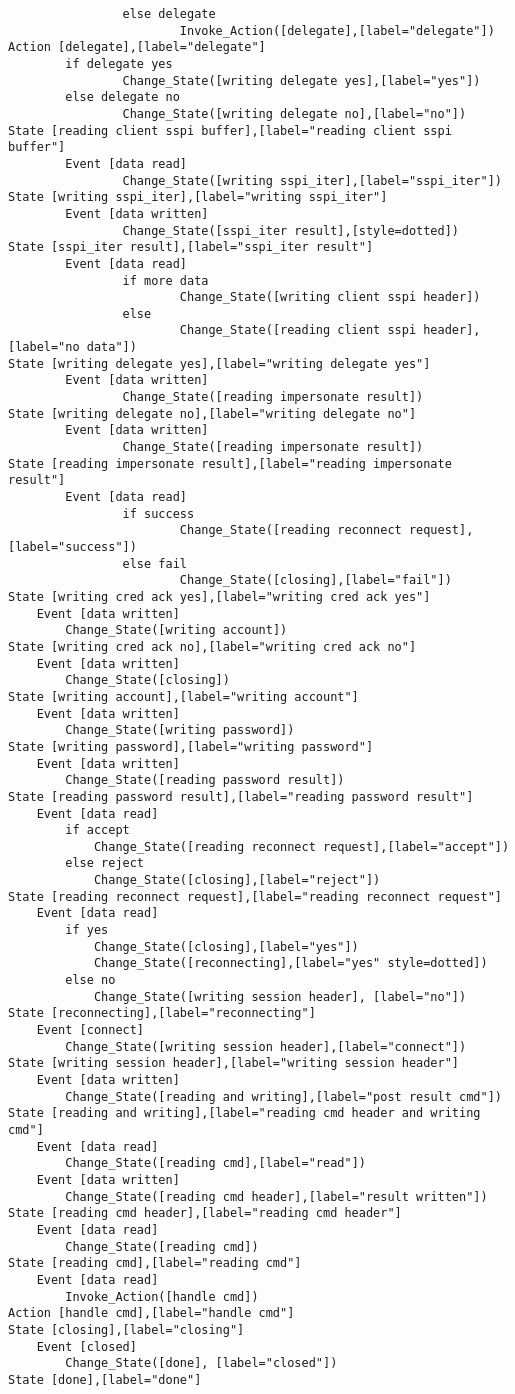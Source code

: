 \begin{verbatim}
                else delegate
                        Invoke_Action([delegate],[label="delegate"])
Action [delegate],[label="delegate"]
        if delegate yes
                Change_State([writing delegate yes],[label="yes"])
        else delegate no
                Change_State([writing delegate no],[label="no"])
State [reading client sspi buffer],[label="reading client sspi buffer"]
        Event [data read]
                Change_State([writing sspi_iter],[label="sspi_iter"])
State [writing sspi_iter],[label="writing sspi_iter"]
        Event [data written]
                Change_State([sspi_iter result],[style=dotted])
State [sspi_iter result],[label="sspi_iter result"]
        Event [data read]
				if more data
						Change_State([writing client sspi header])
				else
						Change_State([reading client sspi header],[label="no data"])
State [writing delegate yes],[label="writing delegate yes"]
        Event [data written]
                Change_State([reading impersonate result])
State [writing delegate no],[label="writing delegate no"]
        Event [data written]
                Change_State([reading impersonate result])
State [reading impersonate result],[label="reading impersonate result"]
        Event [data read]
                if success
                        Change_State([reading reconnect request],[label="success"])
                else fail
                        Change_State([closing],[label="fail"])
State [writing cred ack yes],[label="writing cred ack yes"]
	Event [data written]
		Change_State([writing account])
State [writing cred ack no],[label="writing cred ack no"]
	Event [data written]
		Change_State([closing])
State [writing account],[label="writing account"]
	Event [data written]
		Change_State([writing password])
State [writing password],[label="writing password"]
	Event [data written]
		Change_State([reading password result])
State [reading password result],[label="reading password result"]
	Event [data read]
		if accept
			Change_State([reading reconnect request],[label="accept"])
		else reject
			Change_State([closing],[label="reject"])
State [reading reconnect request],[label="reading reconnect request"]
	Event [data read]
		if yes
			Change_State([closing],[label="yes"])
			Change_State([reconnecting],[label="yes" style=dotted])
		else no
			Change_State([writing session header], [label="no"])
State [reconnecting],[label="reconnecting"]
	Event [connect]
		Change_State([writing session header],[label="connect"])
State [writing session header],[label="writing session header"]
	Event [data written]
		Change_State([reading and writing],[label="post result cmd"])
State [reading and writing],[label="reading cmd header and writing cmd"]
	Event [data read]
		Change_State([reading cmd],[label="read"])
	Event [data written]
		Change_State([reading cmd header],[label="result written"])
State [reading cmd header],[label="reading cmd header"]
	Event [data read]
		Change_State([reading cmd])
State [reading cmd],[label="reading cmd"]
	Event [data read]
		Invoke_Action([handle cmd])
Action [handle cmd],[label="handle cmd"]
State [closing],[label="closing"]
	Event [closed]
		Change_State([done], [label="closed"])
State [done],[label="done"]
\end{verbatim}
